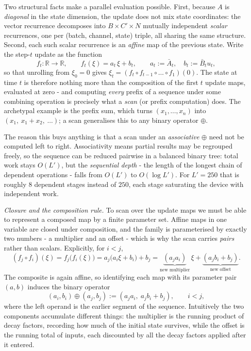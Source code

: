 \documentclass[11pt,a4paper]{article}
\newcommand{\R}{\mathbb{R}}
\begin{document}
\begin{enumerate}
	Two structural facts make a parallel evaluation possible. First, because $A$ is \emph{diagonal} in the state dimension, the update does not mix state coordinates: the vector recurrence decomposes into $B \times C' \times N$ mutually independent \emph{scalar} recurrences, one per (batch, channel, state) triple, all sharing the same structure. Second, each such scalar recurrence is an \emph{affine} map of the previous state. Write the step-$t$ update as the function
	$$f_t : \R \to \R, \qquad f_t(\xi) = a_t\,\xi + b_t, \qquad a_t := \bar{A}_t,\quad b_t := \bar{B}_t u_t,$$
	so that unrolling from $\xi_0 = 0$ gives $\xi_t = (f_t \circ f_{t-1} \circ \dots \circ f_1)(0)$. The state at time $t$ is therefore nothing more than the composition of the first $t$ update maps, evaluated at zero - and computing \emph{every} prefix of a sequence under some combining operation is precisely what a \emph{scan} (or prefix computation) does. The archetypal example is the prefix sum, which turns $(x_1, \dots, x_n)$ into $(x_1,\ x_1 + x_2,\ \dots)$; a scan generalises this to any binary operator $\oplus$.
		
	The reason this buys anything is that a scan under an \emph{associative} $\oplus$ need not be computed left to right. Associativity means partial results may be regrouped freely, so the sequence can be reduced pairwise in a balanced binary tree: total work stays $O(L')$, but the \emph{sequential depth} - the length of the longest chain of dependent operations - falls from $O(L')$ to $O(\log L')$. For $L' = 250$ that is roughly $8$ dependent stages instead of $250$, each stage saturating the device with independent work.
		
	\textit{Closure and the composition rule.} To scan over the update maps we must be able to represent a composed map by a finite parameter set. Affine maps in one variable are closed under composition, and the family is parameterised by exactly two numbers - a multiplier and an offset - which is why the scan carries \emph{pairs} rather than scalars. Explicitly, for $i < j$,
	$$(f_j \circ f_i)(\xi) = f_j\bigl(f_i(\xi)\bigr) = a_j\bigl(a_i \xi + b_i\bigr) + b_j = \underbrace{(a_j a_i)}_{\text{new multiplier}}\,\xi + \underbrace{(a_j b_i + b_j)}_{\text{new offset}}.$$
	The composite is again affine, so identifying each map with its parameter pair $(a,b)$ induces the binary operator
	$$(a_i, b_i) \oplus (a_j, b_j) := (a_j a_i,\; a_j b_i + b_j), \qquad i < j,$$
	where the left operand is the earlier segment of the sequence. Intuitively the two components accumulate different things: the multiplier is the running product of decay factors, recording how much of the initial state survives, while the offset is the running total of inputs, each discounted by all the decay factors applied after it entered.
		

\end{enumerate}
\end{document}
